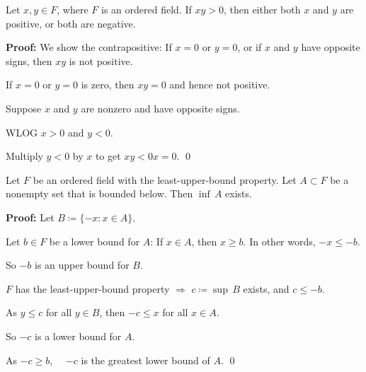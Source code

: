 \documentclass[10pt,aspectratio=169]{beamer}
\begin{document}
\begin{frame}

\begin{proposition}
Let $x,y \in F$, where $F$ is an ordered field.  If
$xy > 0$, then either both $x$ and $y$ are positive, or both are negative.
\end{proposition}

\pause
\textbf{Proof:}
We show the contrapositive: If $x=0$ or $y=0$, or
if $x$ and $y$ have opposite signs, then $xy$ is not positive.

\medskip
\pause

If $x=0$ or $y=0$ is zero, then $xy=0$ and hence not positive.

\medskip
\pause

Suppose $x$ and $y$ are nonzero and have opposite signs.

\pause

WLOG $x > 0$ and $y < 0$.

\pause

Multiply $y < 0$ by $x$ to get $xy < 0x = 0$.
\qed

\end{frame}

\begin{frame}

\begin{proposition}
Let $F$ be an ordered field with the least-upper-bound property.
Let $A \subset F$ be a nonempty set that is bounded below.
Then $\inf\, A$ exists.
\end{proposition}

\pause

\textbf{Proof:}
Let $B \coloneqq \{ -x : x \in A \}$.

\pause
Let $b \in F$ be a lower bound for $A$:
If $x \in A$, then $x \geq b$. In other words, $-x \leq -b$.

\pause
So $-b$ is an upper bound for $B$.

\pause
$F$ has the least-upper-bound property $\Rightarrow$ $c\coloneqq\sup\, B$ exists, and $c \leq -b$.

\pause
As $y \leq c$ for all $y \in B$, then $-c \leq x$ for all $x \in A$.

\pause
So $-c$ is a lower bound for $A$.

\pause
As $-c \geq b$,~~
$-c$ is the greatest lower bound of $A$.
\qed

\end{frame}
\end{document}
